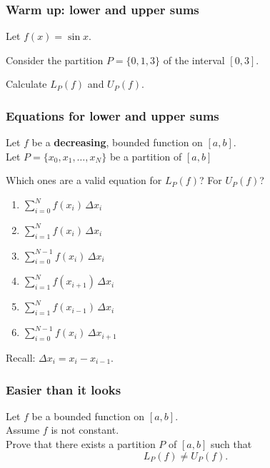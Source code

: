 \begin{frame}[t]
	\frametitle{Warm up: lower and upper sums}

	Let $\displaystyle f(x) = \sin x$.

	Consider the partition $\displaystyle P= \{0, 1, 3\}$ of the interval
	$\displaystyle [0,3]$.

	Calculate $\displaystyle L_{P}(f)$ and $\displaystyle U_{P}(f)$.
\end{frame}

\begin{frame}[t]
	\fontsize{13}{13}\selectfont
	\frametitle{Equations for lower and upper sums}

	Let $f$ be a {\bfseries decreasing}, bounded function on $[a,b]$. \\ Let $\displaystyle
	P = \{x_{0}, x_{1}, \ldots, x_{N}\}$ be a partition of $[a,b]$

	Which ones are a valid equation for $L_{P}(f)$? For $U_{P}(f)$?

	\begin{multicols}{3}
		\begin{enumerate}
			\item $\displaystyle \sum_{i=0}^{N}f(x_{i}) \, \Delta x_{i}$

			\item $\displaystyle \sum_{i = 1}^{N}f(x_{i}) \, \Delta x_{i}$

			\item $\displaystyle \sum_{i = 0}^{N-1}f(x_{i}) \, \Delta x_{i}$

			\item $\displaystyle \sum_{i = 1}^{N}f(x_{i+1}) \, \Delta x_{i}$

			\item $\displaystyle \sum_{i = 1}^{N}f(x_{i-1}) \, \Delta x_{i}$

			\item $\displaystyle \sum_{i = 0}^{N-1}f(x_{i}) \, \Delta x_{i+1}$
		\end{enumerate}
	\end{multicols}

	Recall: $\displaystyle \Delta x_{i}= x_{i}- x_{i-1}$.
\end{frame}

\begin{frame}[t]
	\frametitle{Easier than it looks}

	Let $f$ be a bounded function on $[a,b]$. \\ Assume $f$ is not constant. \\
	Prove that there exists a partition $P$ of $[a,b]$ such that
	\[
		L_{P}(f) \neq U_{P}(f).
	\]
\end{frame}

